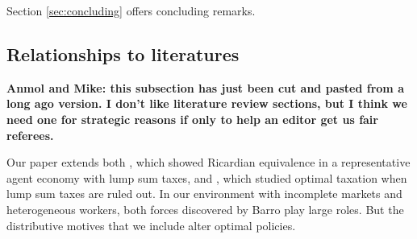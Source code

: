 \documentclass[thmsb,11pt]{article}
\begin{document}
Section \ref{sec:concluding} offers concluding remarks.  




\subsection{Relationships to literatures}
\textbf{Anmol and Mike: this subsection has just been cut and pasted from a long ago version. I don't like literature review sections, but
I think we need one for strategic reasons if only to help an editor get us fair referees.}

Our paper extends both \citet{Barro1974}, which showed Ricardian equivalence in a representative agent economy with lump sum taxes,
and \citet{Barro1979}, which studied  optimal taxation  when lump sum taxes are ruled out. In our environment with incomplete markets and heterogeneous workers,
both forces discovered by Barro play large roles.  But the distributive motives that we include alter optimal policies.
\end{document}
